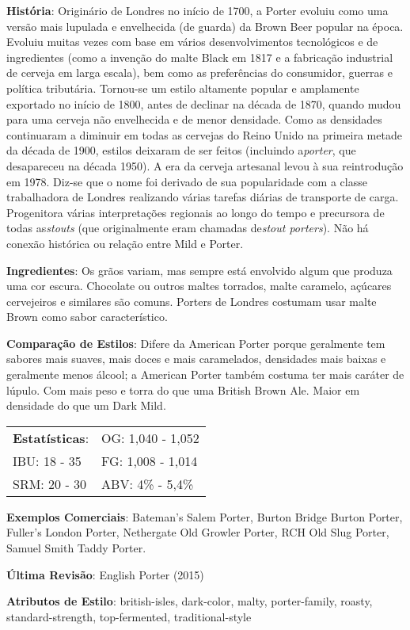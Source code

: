 \textbf{História}: Originário de Londres no início de 1700, a Porter evoluiu como uma versão mais lupulada e envelhecida (de guarda) da Brown Beer popular na época. Evoluiu muitas vezes com base em vários desenvolvimentos tecnológicos e de ingredientes (como a invenção do malte Black em 1817 e a fabricação industrial de cerveja em larga escala), bem como as preferências do consumidor, guerras e política tributária. Tornou-se um estilo altamente popular e amplamente exportado no início de 1800, antes de declinar na década de 1870, quando mudou para uma cerveja não envelhecida e de menor densidade. Como as densidades continuaram a diminuir em todas as cervejas do Reino Unido na primeira metade da década de 1900, estilos deixaram de ser feitos (incluindo a\textit{porter}, que desapareceu na década 1950). A era da cerveja artesanal levou à sua reintrodução em 1978. Diz-se que o nome foi derivado de sua popularidade com a classe trabalhadora de Londres realizando várias tarefas diárias de transporte de carga. Progenitora várias interpretações regionais ao longo do tempo e precursora de todas as\textit{stouts} (que originalmente eram chamadas de\textit{stout porters}). Não há conexão histórica ou relação entre Mild e Porter.

\textbf{Ingredientes}: Os grãos variam, mas sempre está envolvido algum que produza uma cor escura. Chocolate ou outros maltes torrados, malte caramelo, açúcares cervejeiros e similares são comuns. Porters de Londres costumam usar malte Brown como sabor característico.

\textbf{Comparação de Estilos}: Difere da American Porter porque geralmente tem sabores mais suaves, mais doces e mais caramelados, densidades mais baixas e geralmente menos álcool; a American Porter também costuma ter mais caráter de lúpulo. Com mais peso e torra do que uma British Brown Ale. Maior em densidade do que um Dark Mild.

\begin{tabular}{@{}p{35mm}p{35mm}@{}}
  \textbf{Estatísticas}: & OG: 1,040 - 1,052 \\
  IBU: 18 - 35  & FG: 1,008 - 1,014  \\
  SRM: 20 - 30  & ABV: 4\% - 5,4\%
\end{tabular}

\textbf{Exemplos Comerciais}: Bateman’s Salem Porter, Burton Bridge Burton Porter, Fuller's London Porter, Nethergate Old Growler Porter, RCH Old Slug Porter, Samuel Smith Taddy Porter.

\textbf{Última Revisão}: English Porter (2015)

\textbf{Atributos de Estilo}: british-isles, dark-color, malty, porter-family, roasty, standard-strength, top-fermented, traditional-style
